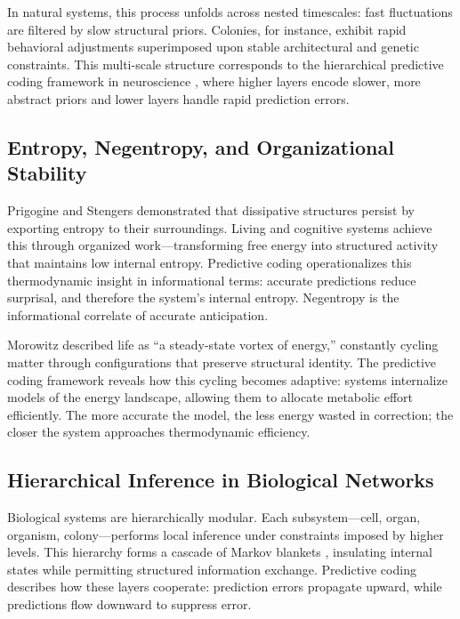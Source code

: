 \documentclass[11pt,a4paper]{article}
\begin{document}
In natural systems, this process unfolds across nested timescales: fast fluctuations are filtered by slow structural priors.  Colonies, for instance, exhibit rapid behavioral adjustments superimposed upon stable architectural and genetic constraints.  This multi-scale structure corresponds to the hierarchical predictive coding framework in neuroscience \citep{Friston2010FreeEnergyPrinciple}, where higher layers encode slower, more abstract priors and lower layers handle rapid prediction errors.

\subsection{Entropy, Negentropy, and Organizational Stability}

Prigogine and Stengers \citep{Prigogine1977SelfOrganizationNonequilibrium} demonstrated that dissipative structures persist by exporting entropy to their surroundings.  Living and cognitive systems achieve this through organized work—transforming free energy into structured activity that maintains low internal entropy.  Predictive coding operationalizes this thermodynamic insight in informational terms: accurate predictions reduce surprisal, and therefore the system’s internal entropy.  Negentropy is the informational correlate of accurate anticipation.

Morowitz \citep{Morowitz1968EnergyFlowBiology} described life as “a steady-state vortex of energy,” constantly cycling matter through configurations that preserve structural identity.  The predictive coding framework reveals how this cycling becomes adaptive: systems internalize models of the energy landscape, allowing them to allocate metabolic effort efficiently.  The more accurate the model, the less energy wasted in correction; the closer the system approaches thermodynamic efficiency.

\subsection{Hierarchical Inference in Biological Networks}

Biological systems are hierarchically modular.  Each subsystem—cell, organ, organism, colony—performs local inference under constraints imposed by higher levels.  This hierarchy forms a cascade of Markov blankets \citep{Palacios2020ActiveInferenceSocial}, insulating internal states while permitting structured information exchange.  Predictive coding describes how these layers cooperate: prediction errors propagate upward, while predictions flow downward to suppress error.
\end{document}
